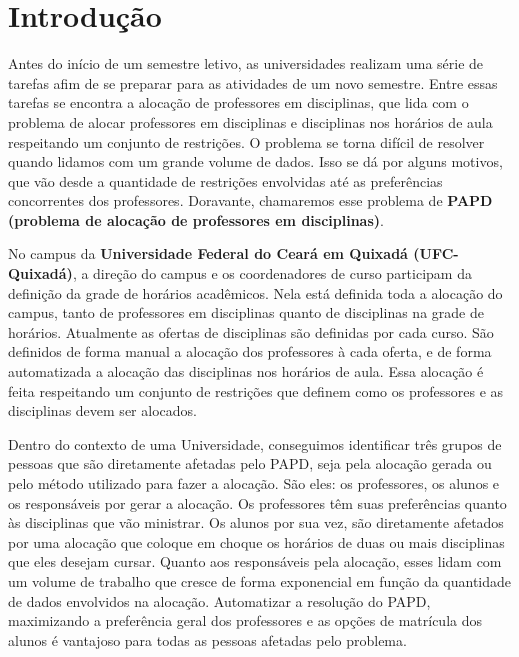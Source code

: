 
\chapter{Introdução}

Antes do início de um semestre letivo, as universidades realizam uma série de tarefas afim de se preparar para as atividades de um novo semestre. Entre essas tarefas se encontra a alocação de professores em disciplinas, que lida com o problema de alocar professores em disciplinas e disciplinas nos horários de aula respeitando um conjunto de restrições. O problema se torna difícil de resolver quando lidamos com um grande volume de dados. Isso se dá por alguns motivos, que vão desde a quantidade de restrições envolvidas até as preferências concorrentes dos professores. Doravante, chamaremos esse problema de \textbf{PAPD (problema de alocação de professores em disciplinas)}.

No campus da \textbf{Universidade Federal do Ceará em Quixadá (UFC-Quixadá)}, a direção do campus e os coordenadores de curso participam da definição da grade de horários acadêmicos. Nela está definida toda a alocação do campus, tanto de professores em disciplinas quanto de disciplinas na grade de horários. Atualmente as ofertas de disciplinas são definidas por cada curso. São definidos de forma manual a alocação dos professores à cada oferta, e de forma automatizada a alocação das disciplinas nos horários de aula. Essa alocação é feita respeitando um conjunto de restrições que definem como os professores e as disciplinas devem ser alocados.

Dentro do contexto de uma Universidade, conseguimos identificar três grupos de pessoas que são diretamente afetadas pelo PAPD, seja pela alocação gerada ou pelo método utilizado para fazer a alocação. São eles: os professores, os alunos e os responsáveis por gerar a alocação. Os professores têm suas preferências quanto às disciplinas que vão ministrar. Os alunos por sua vez, são diretamente afetados por uma alocação que coloque em choque os horários de duas ou mais disciplinas que eles desejam cursar. Quanto aos responsáveis pela alocação, esses lidam com um volume de trabalho que cresce de forma exponencial em função da quantidade de dados envolvidos na alocação. Automatizar a resolução do PAPD, maximizando a preferência geral dos professores e as opções de matrícula dos alunos é vantajoso para todas as pessoas afetadas pelo problema.

